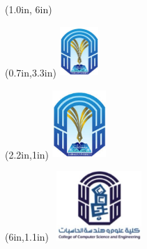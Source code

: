 \newcommand{\titlefont}{\fontfamily{ptm}\fontsize{18}{22}\selectfont\bfseries}

\begin{titlepage}
    

    \begin{textblock*}{1cm}(1.0in, 6in)  %
    \end{textblock*}

    \vspace*{1.2in}
    \centering
    
    \begin{textblock*}{1.04in}(0.7in,3.3in)
    \includegraphics[width=0.576in,height=0.7488in]{assets/uni.png}
    \end{textblock*}
    
    \begin{textblock*}{1.04in}(2.2in,1in)
    \includegraphics[width=0.8in,height=1.04in]{assets/uni.png}
    \end{textblock*}

    \begin{textblock*}{1.04in}(6in,1.1in)
    \includegraphics[width=1.4in,height=1.04in]{assets/dep.png}
    \end{textblock*}


\end{titlepage}

